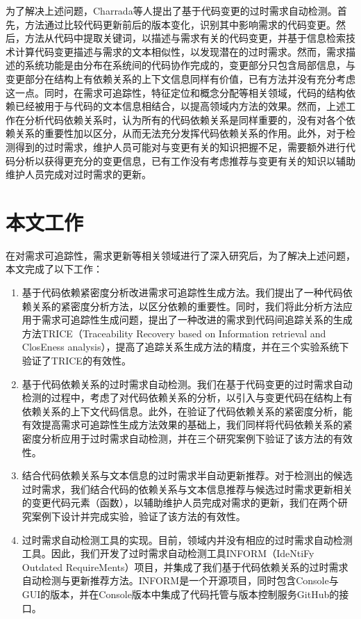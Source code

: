 为了解决上述问题，Charrada等人提出了基于代码变更的过时需求自动检测\cite{ben2012identifying}。首先，方法通过比较代码更新前后的版本变化，识别其中影响需求的代码变更。然后，方法从代码中提取关键词，以描述与需求有关的代码变更，并基于信息检索技术计算代码变更描述与需求的文本相似性，以发现潜在的过时需求。然而，需求描述的系统功能是由分布在系统间的代码协作完成的，变更部分只包含局部信息，与变更部分在结构上有依赖关系的上下文信息同样有价值，已有方法并没有充分考虑这一点。同时，在需求可追踪性，特征定位和概念分配等相关领域，代码的结构依赖已经被用于与代码的文本信息相结合\cite{mcmillan2009combining,panichella2013and,zhao2006sniafl,scanniello2015link}，以提高领域内方法的效果。然而，上述工作在分析代码依赖关系时，认为所有的代码依赖关系是同样重要的，没有对各个依赖关系的重要性加以区分，从而无法充分发挥代码依赖关系的作用。此外，对于检测得到的过时需求，维护人员可能对与变更有关的知识把握不足，需要额外进行代码分析以获得更充分的变更信息，已有工作没有考虑推荐与变更有关的知识以辅助维护人员完成对过时需求的更新。

\section{本文工作}
在对需求可追踪性，需求更新等相关领域进行了深入研究后，为了解决上述问题，本文完成了以下工作：
\begin{enumerate}
  \item 基于代码依赖紧密度分析改进需求可追踪性生成方法。我们提出了一种代码依赖关系的紧密度分析方法，以区分依赖的重要性。同时，我们将此分析方法应用于需求可追踪性生成问题，提出了一种改进的需求到代码间追踪关系的生成方法TRICE（Traceability Recovery based on Information retrieval and ClosEness analysis），提高了追踪关系生成方法的精度，并在三个实验系统下验证了TRICE的有效性。
  \item 基于代码依赖关系的过时需求自动检测。我们在基于代码变更的过时需求自动检测的过程中，考虑了对代码依赖关系的分析，以引入与变更代码在结构上有依赖关系的上下文代码信息。此外，在验证了代码依赖关系的紧密度分析，能有效提高需求可追踪性生成方法效果的基础上，我们同样将代码依赖关系的紧密度分析应用于过时需求自动检测，并在三个研究案例下验证了该方法的有效性。
  \item 结合代码依赖关系与文本信息的过时需求半自动更新推荐。对于检测出的候选过时需求，我们结合代码的依赖关系与文本信息推荐与候选过时需求更新相关的变更代码元素（函数），以辅助维护人员完成对需求的更新，我们在两个研究案例下设计并完成实验，验证了该方法的有效性。
  \item 过时需求自动检测工具的实现。目前，领域内并没有相应的过时需求自动检测工具。因此，我们开发了过时需求自动检测工具INFORM（IdeNtiFy Outdated RequireMents）项目，并集成了我们基于代码依赖关系的过时需求自动检测与更新推荐方法。INFORM是一个开源项目，同时包含Console与GUI的版本，并在Console版本中集成了代码托管与版本控制服务GitHub的接口。
\end{enumerate}

